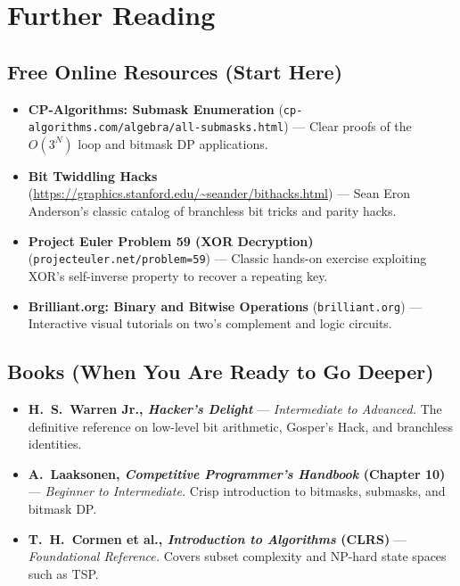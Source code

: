 \documentclass[11pt,a4paper]{article}
\theoremstyle{definition}
\newcounter{exercise}
\begin{document}
\section{Further Reading}

\subsection*{Free Online Resources (Start Here)}
\begin{itemize}
    \item \textbf{CP-Algorithms: Submask Enumeration} (\texttt{cp-algorithms.com/algebra/all-submasks.html}) --- Clear proofs of the $O(3^N)$ loop and bitmask DP applications.
    \item \textbf{Bit Twiddling Hacks} (\url{https://graphics.stanford.edu/~seander/bithacks.html}) --- Sean Eron Anderson's classic catalog of branchless bit tricks and parity hacks.
    \item \textbf{Project Euler Problem 59 (XOR Decryption)} (\texttt{projecteuler.net/problem=59}) --- Classic hands-on exercise exploiting XOR's self-inverse property to recover a repeating key.
    \item \textbf{Brilliant.org: Binary and Bitwise Operations} (\texttt{brilliant.org}) --- Interactive visual tutorials on two's complement and logic circuits.
\end{itemize}

\subsection*{Books (When You Are Ready to Go Deeper)}
\begin{itemize}
    \item \textbf{H.\ S.\ Warren Jr., \emph{Hacker's Delight}} --- \emph{Intermediate to Advanced.} The definitive reference on low-level bit arithmetic, Gosper's Hack, and branchless identities.
    \item \textbf{A.\ Laaksonen, \emph{Competitive Programmer's Handbook} (Chapter 10)} --- \emph{Beginner to Intermediate.} Crisp introduction to bitmasks, submasks, and bitmask DP.
    \item \textbf{T.\ H.\ Cormen et al., \emph{Introduction to Algorithms} (CLRS)} --- \emph{Foundational Reference.} Covers subset complexity and NP-hard state spaces such as TSP.
\end{itemize}
\end{document}
